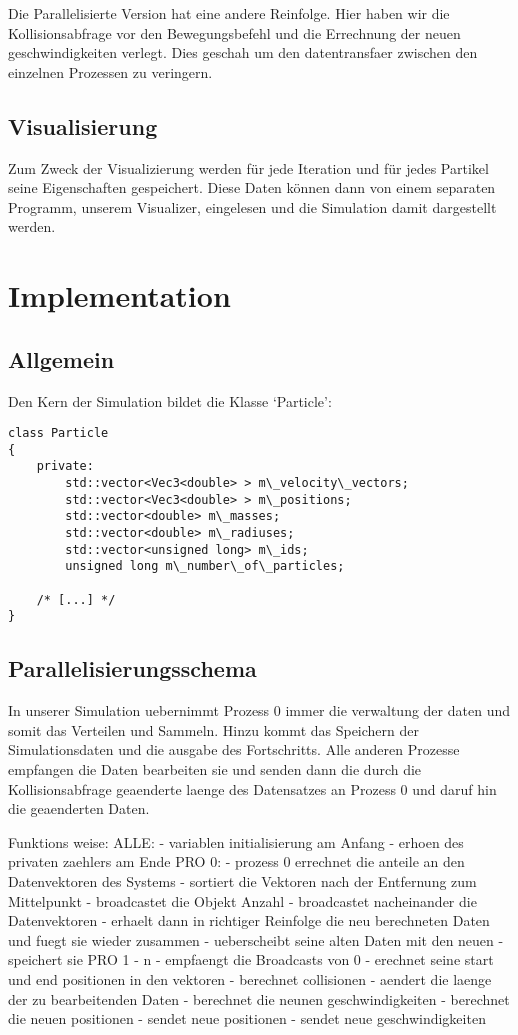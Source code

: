 Die Parallelisierte Version hat eine andere Reinfolge.
Hier haben wir die Kollisionsabfrage vor den Bewegungsbefehl und die Errechnung
der neuen geschwindigkeiten verlegt. Dies geschah um den datentransfaer zwischen
den einzelnen Prozessen zu veringern.

\subsection{Visualisierung}
Zum Zweck der Visualizierung werden für jede Iteration und für jedes Partikel seine
Eigenschaften gespeichert. Diese Daten können dann von einem separaten Programm,
unserem Visualizer, eingelesen und die Simulation damit dargestellt werden.


\section{Implementation}
\subsection{Allgemein}
Den Kern der Simulation bildet die Klasse `Particle':
\begin{verbatim}
class Particle
{
    private:
        std::vector<Vec3<double> > m\_velocity\_vectors;
        std::vector<Vec3<double> > m\_positions;
        std::vector<double> m\_masses;
        std::vector<double> m\_radiuses;
        std::vector<unsigned long> m\_ids;
        unsigned long m\_number\_of\_particles;

    /* [...] */
}
\end{verbatim}

\subsection{Parallelisierungsschema}
In unserer Simulation uebernimmt Prozess 0 immer die verwaltung der daten und somit das Verteilen
und Sammeln. Hinzu kommt das Speichern der Simulationsdaten und die ausgabe des Fortschritts.
Alle anderen Prozesse empfangen die Daten bearbeiten sie und senden dann die
durch die Kollisionsabfrage geaenderte laenge des Datensatzes an Prozess 0
und daruf hin die geaenderten Daten.

Funktions weise:
   ALLE:
       - variablen initialisierung am Anfang
       - erhoen des privaten zaehlers am Ende
   PRO 0:
       - prozess 0 errechnet die anteile an den Datenvektoren des Systems
       - sortiert die Vektoren nach der Entfernung zum Mittelpunkt 
       - broadcastet die Objekt Anzahl
       - broadcastet nacheinander die Datenvektoren
       - erhaelt dann in richtiger Reinfolge die neu berechneten Daten und fuegt sie wieder zusammen
       - ueberscheibt seine alten Daten mit den neuen
       - speichert sie
   PRO 1 - n
       - empfaengt die Broadcasts von 0
       - erechnet seine start und end positionen in den vektoren
       - berechnet collisionen
       - aendert die laenge der zu bearbeitenden Daten
       - berechnet die neunen geschwindigkeiten
       - berechnet die neuen positionen
       - sendet neue positionen
       - sendet neue geschwindigkeiten

